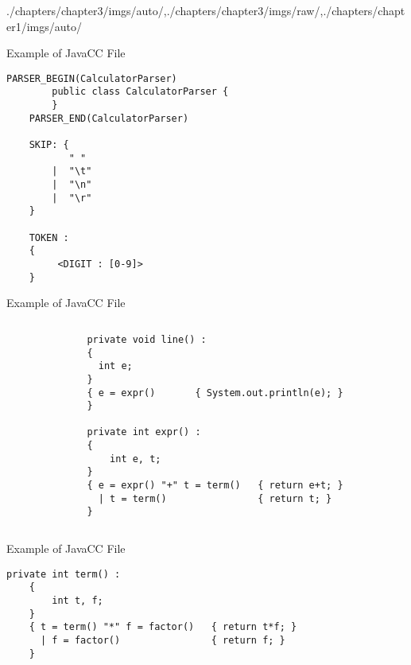 \begin{graphicspathcontext}{{./chapters/chapter3/imgs/auto/},{./chapters/chapter3/imgs/raw/},{./chapters/chapter1/imgs/auto/}}
\begin{bibunit}[apalike]
\begin{frame}[fragile]{Example of JavaCC File }
	\begin{lstlisting}[style=lststyle-java]
	PARSER_BEGIN(CalculatorParser)
	    public class CalculatorParser {
	    }
	PARSER_END(CalculatorParser)

	SKIP: {
	       " "
	    |  "\t"
	    |  "\n"
	    |  "\r"
	}

	TOKEN :
	{
	     <DIGIT : [0-9]>
	}
	\end{lstlisting}
\end{frame}

\begin{frame}[fragile]{Example of JavaCC File }
	\begin{columns}
		\begin{column}{.35\linewidth}\smaller
\begin{bnf}
	 \\
	 \\
	 \\
	 \\
	 \\
	 \\
\end{bnf}
		\end{column}
		\begin{column}{.65\linewidth}
\begin{lstlisting}[style=lststyle-java]
private void line() :
{
  int e;
}
{ e = expr()       { System.out.println(e); }
}

private int expr() :
{
	int e, t;
}
{ e = expr() "+" t = term()   { return e+t; }
  | t = term()                { return t; }
}
\end{lstlisting}
		\end{column}
	\end{columns}
\end{frame}

\begin{frame}[fragile]{Example of JavaCC File }
	\begin{lstlisting}[style=lststyle-java]
	private int term() :
	{
	    int t, f;
	}
	{ t = term() "*" f = factor()   { return t*f; }
	  | f = factor()                { return f; }
	}


\end{lstlisting}
\end{frame}
\end{bibunit}
\end{graphicspathcontext}
